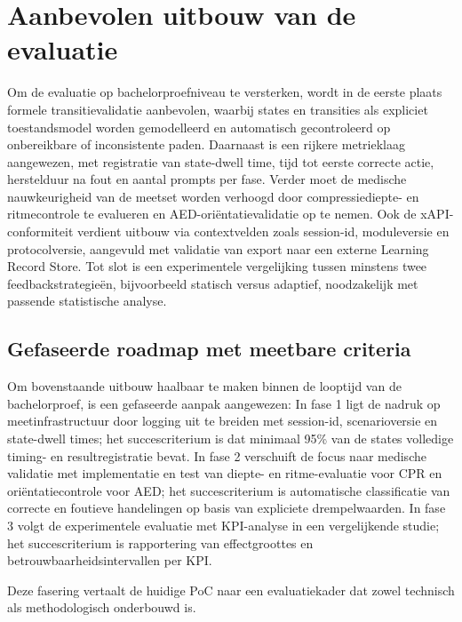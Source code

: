 \section{Aanbevolen uitbouw van de evaluatie}

Om de evaluatie op bachelorproefniveau te versterken, wordt in de eerste plaats formele transitievalidatie aanbevolen, waarbij states en transities als expliciet toestandsmodel worden gemodelleerd en automatisch gecontroleerd op onbereikbare of inconsistente paden. Daarnaast is een rijkere metrieklaag aangewezen, met registratie van state-dwell time, tijd tot eerste correcte actie, herstelduur na fout en aantal prompts per fase. Verder moet de medische nauwkeurigheid van de meetset worden verhoogd door compressiediepte- en ritmecontrole te evalueren en AED-oriëntatievalidatie op te nemen. Ook de xAPI-conformiteit verdient uitbouw via contextvelden zoals session-id, moduleversie en protocolversie, aangevuld met validatie van export naar een externe Learning Record Store. Tot slot is een experimentele vergelijking tussen minstens twee feedbackstrategieën, bijvoorbeeld statisch versus adaptief, noodzakelijk met passende statistische analyse.

\subsection{Gefaseerde roadmap met meetbare criteria}

Om bovenstaande uitbouw haalbaar te maken binnen de looptijd van de bachelorproef, is een gefaseerde aanpak aangewezen:
In fase 1 ligt de nadruk op meetinfrastructuur door logging uit te breiden met session-id, scenarioversie en state-dwell times; het succescriterium is dat minimaal 95\% van de states volledige timing- en resultregistratie bevat. In fase 2 verschuift de focus naar medische validatie met implementatie en test van diepte- en ritme-evaluatie voor CPR en oriëntatiecontrole voor AED; het succescriterium is automatische classificatie van correcte en foutieve handelingen op basis van expliciete drempelwaarden. In fase 3 volgt de experimentele evaluatie met KPI-analyse in een vergelijkende studie; het succescriterium is rapportering van effectgroottes en betrouwbaarheidsintervallen per KPI.

Deze fasering vertaalt de huidige PoC naar een evaluatiekader dat zowel technisch als methodologisch onderbouwd is.
